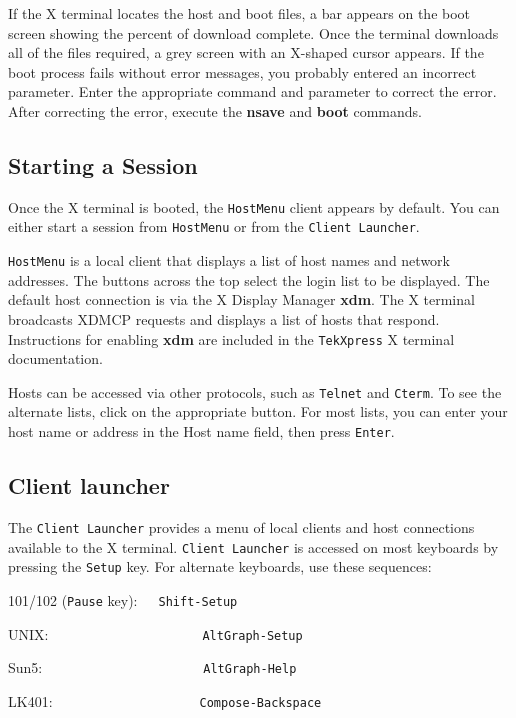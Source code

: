 If the X terminal locates the host and boot files, a bar appears on the boot
screen showing the percent of download complete. Once the terminal downloads
all of the files required, a grey screen with an X-shaped cursor appears. If
the boot process fails without error messages, you probably entered an
incorrect parameter. Enter the appropriate command and parameter to correct
the error. After correcting the error, execute the {\bf nsave} and {\bf boot}
commands.


\subsection {Starting a Session}

Once the X terminal is booted, the {\tt HostMenu} client appears by default.
You can either start a session from {\tt HostMenu} or from the
{\tt Client Launcher}.

{\tt HostMenu} is a local client that displays a list of host names and
network addresses. The buttons across the top select the login list to be
displayed. The default host connection is via the X Display Manager {\bf xdm}.
The X terminal broadcasts XDMCP requests and displays a list of hosts that
respond. Instructions for enabling {\bf xdm} are included in the {\tt TekXpress}
X terminal documentation.

Hosts can be accessed via other protocols, such as {\tt Telnet} and {\tt Cterm}.
To see the alternate lists, click on the appropriate button. For most lists, you
can enter your host name or address in the Host name field, then press
{\tt Enter}.


\subsection {Client launcher}

The {\tt Client Launcher} provides a menu of local clients and host connections
available to the X terminal. {\tt Client Launcher} is accessed on most keyboards
by pressing the {\tt Setup} key. For alternate keyboards, use these sequences:

101/102 ({\tt Pause} key):\ \ \ {\tt Shift-Setup}

UNIX:\ \ \ \ \ \ \ \ \ \ \ \ \ \ \ \ \ \ \ \ \ \ {\tt AltGraph-Setup}

Sun5:\ \ \ \ \ \ \ \ \ \ \ \ \ \ \ \ \ \ \ \ \ \ \ {\tt AltGraph-Help}

LK401:\ \ \ \ \ \ \ \ \ \ \ \ \ \ \ \ \ \ \ \ \ {\tt Compose-Backspace}

